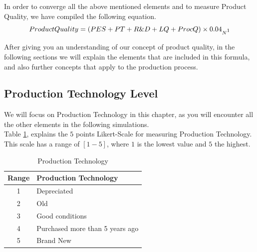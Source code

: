 In order to converge all the above mentioned elements and to measure Product Quality, we have compiled the following equation.
\begin{equation}
ProductQuality = (PES+PT+R\&D+LQ +ProcQ) \times 0.04_{N\footnotemark}
\label{eq:PQ}
\end{equation}
 
After giving you an understanding of our concept of product quality, in the following sections we will explain the elements that  are included in this formula, and also further concepts that apply to the production process.

\subsection{Production Technology Level}
We will focus on Production Technology in this chapter, as you will encounter all the other elements in the following simulations. \\
Table \ref{table:my-label}, explains the $5$ points Likert-Scale for measuring Production Technology. This scale has a range of $[1-5]$, where $1$ is the lowest value and $5$ the highest.

\begin{table}[ht]
\centering
\begin{tabular}{|c|l|}
\hline
 Range & Production Technology\\
\hline
 1 & Depreciated  \\
 2 & Old \\
 3 & Good conditions \\
 4 & Purchased more than 5 years ago  \\
 5 & Brand New\\
\hline
\end{tabular}
\caption{Production Technology}
\label{table:my-label}
\end{table}

